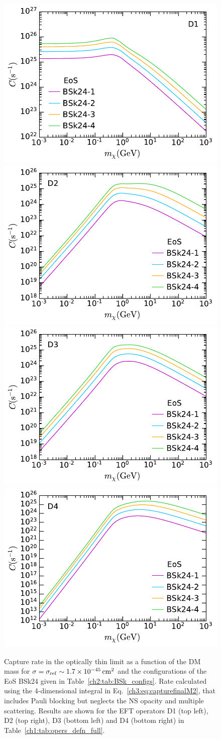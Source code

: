 \begin{figure}[t!bp]
    \centering
    \includegraphics[width=.45\textwidth]{capture_1/capture_rate_numeric_EOS_D1.pdf}
    \includegraphics[width=.45\textwidth]{capture_1/capture_rate_numeric_EOS_D2.pdf}\\
    \includegraphics[width=.45\textwidth]{capture_1/capture_rate_numeric_EOS_D3.pdf}
    \includegraphics[width=.45\textwidth]{capture_1/capture_rate_numeric_EOS_D4.pdf}
    \caption[Capture rate in the optically thin limit as a function of the DM mass for $\sigma=\sigmaref\sim 1.7 \times 10^{-45} \cm^2$ and the configurations of the EoS BSk24 given in Table~\ref{ch2:tab:BSk_configs}.]{Capture rate in the optically thin limit as a function of the DM mass for $\sigma=\sigmaref\sim 1.7 \times 10^{-45} \cm^2$ and the configurations of the EoS BSk24 given in Table~\ref{ch2:tab:BSk_configs}. Rate calculated using the 4-dimensional integral in Eq.~\ref{ch3:eq:capturefinalM2}, that includes Pauli blocking but neglects the NS opacity and multiple scattering. Results are shown for the EFT operators D1 (top left), D2 (top right), D3 (bottom left) and D4 (bottom right) in Table~\ref{ch1:tab:opers_defn_full}.}
    \label{ch3:fig:captureEOS}
\end{figure}




